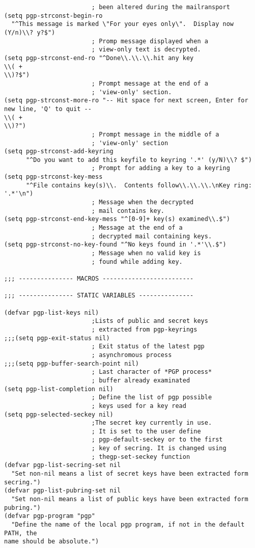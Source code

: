 \begin{verbatim}
        				; been altered during the mailransport
(setq pgp-strconst-begin-ro
  "^This message is marked \"For your eyes only\".  Display now (Y/n)\\? y?$")
        				; Promp message displayed when a
        				; view-only text is decrypted.
(setq pgp-strconst-end-ro "^Done\\.\\.\\.hit any key
\\( +
\\)?$")
        				; Prompt message at the end of a
        				; 'view-only' section.
(setq pgp-strconst-more-ro "-- Hit space for next screen, Enter for new line, 'Q' to quit --
\\( +
\\)?")
        				; Prompt message in the middle of a
        				; 'view-only' section
(setq pgp-strconst-add-keyring
      "^Do you want to add this keyfile to keyring '.*' (y/N)\\? $")
        				; Prompt for adding a key to a keyring
(setq pgp-strconst-key-mess
      "^File contains key(s)\\.  Contents follow\\.\\.\\.\nKey ring: '.*'\n")
        				; Message when the decrypted
        				; mail contains key.
(setq pgp-strconst-end-key-mess "^[0-9]+ key(s) examined\\.$")
        				; Message at the end of a
        				; decrypted mail containing keys.
(setq pgp-strconst-no-key-found "^No keys found in '.*'\\.$")
        				; Message when no valid key is
        				; found while adding key.

;;; --------------- MACROS -------------------------

;;; --------------- STATIC VARIABLES ---------------

(defvar pgp-list-keys nil)
        				;Lists of public and secret keys
        				; extracted from pgp-keyrings
;;;(setq pgp-exit-status nil)
        				; Exit status of the latest pgp
        				; asynchromous process
;;;(setq pgp-buffer-search-point nil)
        				; Last character of *PGP process*
        				; buffer already examinated
(setq pgp-list-completion nil)
        				; Define the list of pgp possible
        				; keys used for a key read
(setq pgp-selected-seckey nil)
        				;The secret key currently in use.
        				; It is set to the user define
        				; pgp-default-seckey or to the first
        				; key of secring. It is changed using
        				; thegp-set-seckey function
(defvar pgp-list-secring-set nil
  "Set non-nil means a list of secret keys have been extracted form secring.")
(defvar pgp-list-pubring-set nil
  "Set non-nil means a list of public keys have been extracted form pubring.")
(defvar pgp-program "pgp"
  "Define the name of the local pgp program, if not in the default PATH, the
name should be absolute.")


\end{verbatim}
